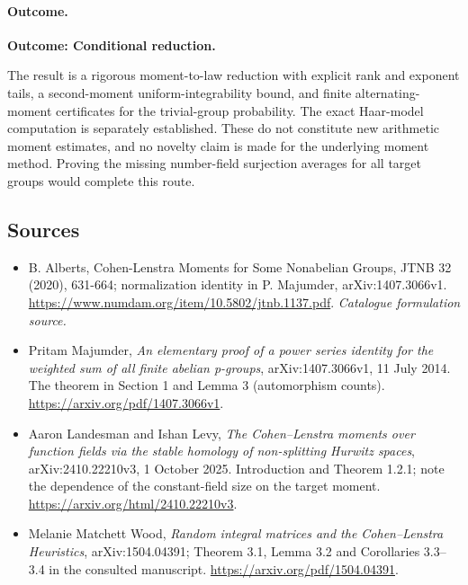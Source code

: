 \documentclass[11pt,a4paper]{article}
\numberwithin{equation}{section}
\begin{document}
\paragraph{Outcome.}
\textbf{Outcome: Conditional reduction.}

The result is a rigorous moment-to-law reduction with explicit rank and
exponent tails, a second-moment uniform-integrability bound, and finite
alternating-moment certificates for the trivial-group probability.
The exact Haar-model computation is separately established. These do not
constitute new arithmetic moment estimates, and no novelty claim is made
for the underlying moment method. Proving the missing number-field
surjection averages for all target groups would complete this route.
\subsection{Sources}
\begin{itemize}\raggedright
\item[\textnormal{[S1]}]\hypertarget{source:statement:1}{} B. Alberts, Cohen-Lenstra Moments for Some Nonabelian Groups, JTNB 32 (2020), 631-664; normalization identity in P. Majumder, arXiv:1407.3066v1.
\url{https://www.numdam.org/item/10.5802/jtnb.1137.pdf}.
{\small\textit{Catalogue formulation source.}}
\item[\textnormal{[E1]}]\hypertarget{extra:statement:1}{} Pritam Majumder,
\emph{An elementary proof of a power series identity for the weighted sum
of all finite abelian p-groups}, arXiv:1407.3066v1, 11 July 2014.
The theorem in Section 1 and Lemma 3 (automorphism counts).
\url{https://arxiv.org/pdf/1407.3066v1}.
\item[\textnormal{[E2]}]\hypertarget{extra:statement:2}{} Aaron Landesman and Ishan Levy,
\emph{The Cohen--Lenstra moments over function fields via the stable
homology of non-splitting Hurwitz spaces}, arXiv:2410.22210v3,
1 October 2025. Introduction and Theorem 1.2.1; note the dependence of
the constant-field size on the target moment.
\url{https://arxiv.org/html/2410.22210v3}.
\item[\textnormal{[E3]}]\hypertarget{extra:statement:3}{} Melanie Matchett Wood,
\emph{Random integral matrices and the Cohen--Lenstra Heuristics},
arXiv:1504.04391; Theorem 3.1, Lemma 3.2 and Corollaries 3.3--3.4
in the consulted manuscript.
\url{https://arxiv.org/pdf/1504.04391}.
\end{itemize}
\end{document}
